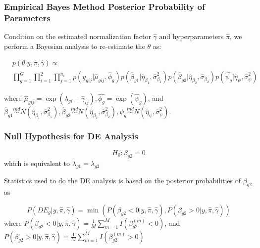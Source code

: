 \documentclass[handout,10pt]{beamer}
\begin{document}
\begin{frame}
\frametitle{Empirical Bayes Method Posterior Probability of Parameters}

Condition on the estimated normalization factor $\hat{\gamma}$ and hyperparameters $\hat{\pi}$, we perform a Bayesian analysis to re-estimate the $\theta$ as:

\begin{equation}
\begin{split}
& p(\theta | y, \hat{\pi}, \hat{\gamma})  \propto \\ & \prod_{g=1}^{G} \prod_{i=1}^{2} \prod_{j=1}^{n_i} p(y_{gij} |\hat{\mu}_{gij}, \hat{\phi}_g ) p(\hat{\beta}_{g1} |\hat{\eta}_{\beta_1}, \hat{\sigma}^2_{\beta_1}) p(\hat{\beta}_{g2} | \hat{\eta}_{\beta_2}, \hat{\sigma}_{\beta_2}) p(\hat{\psi_g} | \hat{\eta}_{\psi}, \hat{\sigma}^2_{\psi})  
\end{split}
\end{equation}

where $\hat{\mu}_{gij}=\exp(\lambda_{gi}+ \hat{\gamma}_{ij}), \hat{\phi_g}=\exp(\hat{\psi}_g)$, and
$\hat{\beta}_{g1} \stackrel{ind}{\sim} N(\hat{\eta}_{\beta_1}, \hat{\sigma}^2_{\beta_1}), \hat{\beta}_{g2} \stackrel{ind}{\sim} N(\hat{\eta}_{\beta_2} , \hat{\sigma}^2_{\beta_2}), \psi_g \stackrel{ind}{\sim} N(\hat{\eta}_\psi, \hat{\sigma}^2_\psi)$.

\end{frame}

\begin{frame}
\frametitle{Null Hypothesis for DE Analysis}

$$H_0: \beta_{g2}=0$$ which is equivalent to $\lambda_{g1}=\lambda_{g2}$

Statistics used to do the DE analysis is based on the posterior probabilities of $\beta_{g2}$ as

$$P(DE_g|y, \hat{\pi}, \hat{\gamma}) = \min(P(\beta_{g2}<0|y, \hat{\pi}, \hat{\gamma}), P(\beta_{g2}>0|y, \hat{\pi}, \hat{\gamma}))$$
where $P(\beta_{g2}<0|y, \hat{\pi}, \hat{\gamma}) = \frac{1}{M}\sum_{m=1}^M I(\beta_{g2}^{(m)} < 0)$, and $P(\beta_{g2}>0|y, \hat{\pi}, \hat{\gamma}) = \frac{1}{M}\sum_{m=1}^M I(\beta_{g2}^{(m)} > 0)$



\end{frame}
\end{document}
